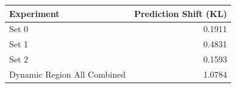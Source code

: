 \begin{tabular}{lr}
\toprule
Experiment & Prediction Shift (KL) \\
\midrule
Set 0 & 0.1911 \\
Set 1 & 0.4831 \\
Set 2 & 0.1593 \\
Dynamic Region All Combined & 1.0784 \\
\bottomrule
\end{tabular}
